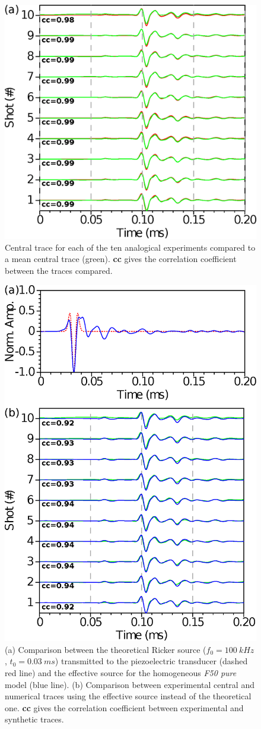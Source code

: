 \documentclass[paper,extra]{gji} %
\begin{document}
\begin{figure}[!h]
\centering
\includegraphics[width=0.75\columnwidth]{fig/musc_F50_CT.eps}
\caption{Central trace for each of the ten analogical experiments compared to a mean central trace (green). \textbf{cc} gives the correlation coefficient between the traces compared.}
\label{panel_central_traces_cc}
\end{figure}

\begin{figure}[!h]
\centering
\includegraphics[width=0.75\columnwidth]{fig/spec_F50_CT_COMP.eps}
\caption{(a) Comparison between the theoretical Ricker source ($f_{0}=100\ kHz$, $t_{0}=0.03\ ms$) transmitted to the piezoelectric transducer (dashed red line) and the effective source for the homogeneous \textit{F50 pure} model (blue line). (b) Comparison between experimental central and numerical traces using the effective source instead of the theoretical one. \textbf{cc} gives the correlation coefficient between experimental and synthetic traces.}
\label{panel_srcest_2d_mean_comp}
\end{figure}
\end{document}
